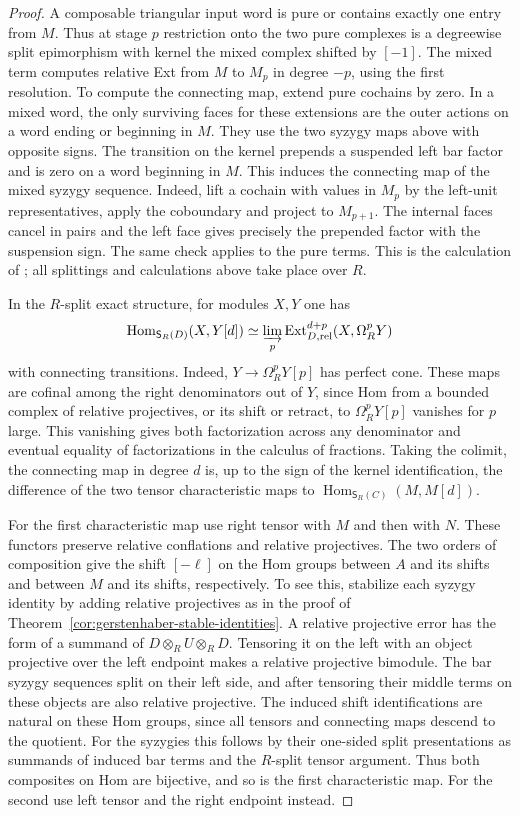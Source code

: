 \documentclass[12pt,a4paper,english,reqno]{amsart}
\numberwithin{equation}{section}
\theoremstyle{plain}
\theoremstyle{definition}
\begin{document}
\begin{proof}
A composable triangular input word is pure or contains
exactly one entry from $M$. Thus at stage $p$ restriction onto
the two pure complexes is a degreewise split epimorphism
with kernel the mixed complex shifted by $[-1]$. The mixed
term computes relative Ext from $M$ to $M_p$ in degree $-p$,
using the first resolution. To compute the connecting map,
extend pure cochains by zero. In a mixed word, the only
surviving faces for these extensions are the outer actions
on a word ending or beginning in $M$. They use the two
syzygy maps above with opposite signs. The transition on
the kernel prepends a suspended left bar factor and is zero
on a word beginning in $M$. This induces the connecting
map of the mixed syzygy sequence. Indeed, lift a cochain
with values in $M_p$ by the left-unit representatives,
apply the coboundary and project to $M_{p+1}$. The internal
faces cancel in pairs and the left face gives precisely the
prepended factor with the suspension sign. The same check
applies to the pure terms. This is the calculation of
\cite[eqs.~(9.20)--(9.22) and Lemma~9.12]{ChenLiWangBInfinity};
all splittings and calculations above take place over $R$.

In the $R$-split exact structure, for modules $X,Y$ one has
\[
 \operatorname{Hom}_{\mathsf S_R(D)}(X,Y[d])
  \simeq\varinjlim_p
       \operatorname{Ext}^{d+p}_{D,\mathrm{rel}}(X,\Omega_R^pY)
\]
with connecting transitions. Indeed, $Y\to\Omega_R^pY[p]$
has perfect cone. These maps are cofinal among the right
denominators out of $Y$, since Hom from a bounded complex of
relative projectives, or its shift or retract, to
$\Omega_R^pY[p]$ vanishes for $p$ large. This vanishing gives
both factorization across any denominator and eventual
equality of factorizations in the calculus of fractions.
Taking the colimit, the connecting map in degree $d$ is,
up to the sign of the kernel identification, the difference
of the two tensor characteristic maps to
$\operatorname{Hom}_{\mathsf S_R(C)}(M,M[d])$.

For the first characteristic map use right tensor with $M$
and then with $N$. These functors preserve relative conflations
and relative projectives. The two orders of composition give
the shift $[-\ell]$ on the Hom groups between $A$ and its
shifts and between $M$ and its shifts, respectively. To see
this, stabilize each syzygy identity by adding relative
projectives as in the proof of
Theorem~\ref{cor:gerstenhaber-stable-identities}. A relative
projective error has the form of a summand of
$D\otimes_R U\otimes_R D$. Tensoring it on the left with
an object projective over the left endpoint makes a
relative projective bimodule. The bar syzygy sequences
split on their left side, and after tensoring their middle
terms on these objects are also relative projective.
The induced shift identifications are natural on these
Hom groups, since all tensors and connecting maps descend
to the quotient. For the syzygies this follows by their
one-sided split presentations as summands of induced bar
terms and the $R$-split tensor argument. Thus both composites
on Hom are bijective, and so is the first characteristic
map. For the second use left tensor and the right endpoint
instead.


\end{proof}
\end{document}
